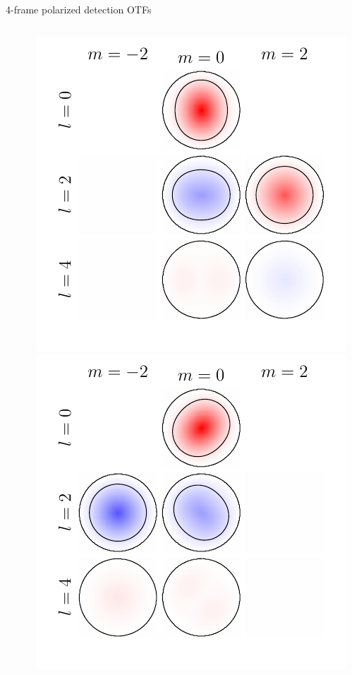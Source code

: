 \documentclass[presentation]{beamer}
\begin{document}
\begin{frame}[label=sec-1]{4-frame polarized detection OTFs}
\begin{columns}
\begin{column}{0.25\textwidth}
    \end{column}
    \begin{column}{0.25\textwidth}
      \centering      
      \includegraphics[width=1.0\columnwidth]{pol_detect/otf0.pdf}\\
      \includegraphics[width=1.0\columnwidth]{pol_detect/otf1.pdf}

\end{column}
\end{columns}
\end{frame}
\end{document}
